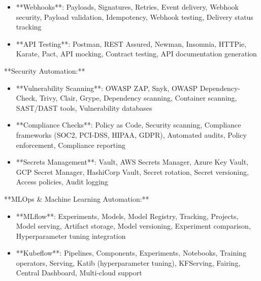 \documentclass[11pt,a4paper]{article}
\begin{document}
\begin{itemize}
\item **Webhooks**: Payloads, Signatures, Retries, Event delivery, Webhook security, Payload validation, Idempotency, Webhook testing, Delivery status tracking
\end{itemize}

\begin{itemize}
\item **API Testing**: Postman, REST Assured, Newman, Insomnia, HTTPie, Karate, Pact, API mocking, Contract testing, API documentation generation
\end{itemize}

**Security Automation:**

\begin{itemize}
\item **Vulnerability Scanning**: OWASP ZAP, Snyk, OWASP Dependency-Check, Trivy, Clair, Grype, Dependency scanning, Container scanning, SAST/DAST tools, Vulnerability databases
\end{itemize}

\begin{itemize}
\item **Compliance Checks**: Policy as Code, Security scanning, Compliance frameworks (SOC2, PCI-DSS, HIPAA, GDPR), Automated audits, Policy enforcement, Compliance reporting
\end{itemize}

\begin{itemize}
\item **Secrets Management**: Vault, AWS Secrets Manager, Azure Key Vault, GCP Secret Manager, HashiCorp Vault, Secret rotation, Secret versioning, Access policies, Audit logging
\end{itemize}

**MLOps \& Machine Learning Automation:**

\begin{itemize}
\item **MLflow**: Experiments, Models, Model Registry, Tracking, Projects, Model serving, Artifact storage, Model versioning, Experiment comparison, Hyperparameter tuning integration
\end{itemize}

\begin{itemize}
\item **Kubeflow**: Pipelines, Components, Experiments, Notebooks, Training operators, Serving, Katib (hyperparameter tuning), KFServing, Fairing, Central Dashboard, Multi-cloud support
\end{itemize}
\end{document}
